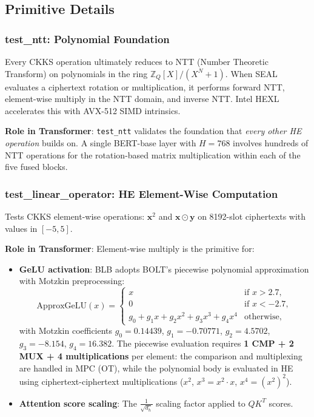 \subsection{Primitive Details}

\subsubsection{test\_ntt: Polynomial Foundation}

Every CKKS operation ultimately reduces to NTT (Number Theoretic Transform) on polynomials in the ring $\mathbb{Z}_Q[X]/(X^N+1)$.
When SEAL evaluates a ciphertext rotation or multiplication, it performs forward NTT, element-wise multiply in the NTT domain, and inverse NTT.
Intel HEXL accelerates this with AVX-512 SIMD intrinsics.

\textbf{Role in Transformer}: \texttt{test\_ntt} validates the foundation that \emph{every other HE operation} builds on.
A single BERT-base layer with $H{=}768$ involves hundreds of NTT operations for the rotation-based matrix multiplication within each of the five fused blocks.

\subsubsection{test\_linear\_operator: HE Element-Wise Computation}

Tests CKKS element-wise operations: $\mathbf{x}^2$ and $\mathbf{x} \odot \mathbf{y}$ on 8192-slot ciphertexts with values in $[-5, 5]$.

\textbf{Role in Transformer}: Element-wise multiply is the primitive for:
\begin{itemize}[nosep]
  \item \textbf{GeLU activation}: BLB adopts BOLT's piecewise polynomial approximation with Motzkin preprocessing:
  \[
  \text{ApproxGeLU}(x) = \begin{cases}
    x & \text{if } x > 2.7, \\
    0 & \text{if } x < -2.7, \\
    g_0 + g_1 x + g_2 x^2 + g_3 x^3 + g_4 x^4 & \text{otherwise},
  \end{cases}
  \]
  with Motzkin coefficients $g_0 {=} 0.14439$, $g_1 {=} {-}0.70771$, $g_2 {=} 4.5702$, $g_3 {=} {-}8.154$, $g_4 {=} 16.382$.
  The piecewise evaluation requires \textbf{1 CMP + 2 MUX + 4 multiplications} per element: the comparison and multiplexing are handled in MPC (OT), while the polynomial body is evaluated in HE using ciphertext-ciphertext multiplications ($x^2$, $x^3 = x^2 \cdot x$, $x^4 = (x^2)^2$).
  \item \textbf{Attention score scaling}: The $\frac{1}{\sqrt{d_h}}$ scaling factor applied to $QK^T$ scores.
\end{itemize}

